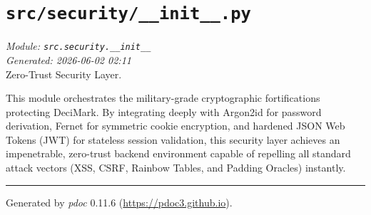 
\section{\texttt{src/security/\_\_init\_\_.py}}
\textit{Module: \texttt{src.security.\_\_init\_\_}} \\
\textit{Generated: 2026-06-02 02:11} \\

Zero-Trust Security Layer.

This module orchestrates the military-grade cryptographic fortifications
protecting DeciMark. By integrating deeply with Argon2id for password
derivation, Fernet for symmetric cookie encryption, and hardened JSON
Web Tokens (JWT) for stateless session validation, this security layer
achieves an impenetrable, zero-trust backend environment capable of
repelling all standard attack vectors (XSS, CSRF, Rainbow Tables, and
Padding Oracles) instantly.

\begin{center}\rule{0.5\linewidth}{0.5pt}
\end{center}

Generated by \emph{pdoc} 0.11.6 (\url{https://pdoc3.github.io}).
